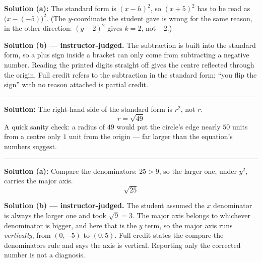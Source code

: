 \documentclass[12pt]{article}
\begin{document}




\textbf{Solution (a):} The standard form is $(x - h)^2$, so $(x + 5)^2$ has to be read as
$\bigl(x - (-5)\bigr)^2$. 
(The $y$-coordinate the student gave is wrong for the same reason, in the other direction:
$(y-2)^2$ gives $k = 2$, not $-2$.)

\vspace{0.15cm}
\textbf{Solution (b) --- instructor-judged.} The subtraction is built into the standard form,
so a plus sign inside a bracket can only come from subtracting a negative number. Reading the
printed digits straight off gives the centre reflected through the origin. Full credit refers
to the subtraction in the standard form; ``you flip the sign'' with no reason attached is
partial credit.

\vspace{0.2cm}\noindent\rule{\linewidth}{0.2pt}


\textbf{Solution:} The right-hand side of the standard form is $r^2$, not $r$.
\[ r = \sqrt{49} \]
A quick sanity check: a radius of $49$ would put the circle's edge nearly $50$ units from a
centre only $1$ unit from the origin --- far larger than the equation's numbers suggest.

\vspace{0.2cm}\noindent\rule{\linewidth}{0.2pt}


\textbf{Solution (a):} Compare the denominators: $25 > 9$, so the larger one, under $y^2$,
carries the major axis.
\[ \sqrt{25} \]

\vspace{0.15cm}
\textbf{Solution (b) --- instructor-judged.} The student assumed the $x$ denominator is
always the larger one and took $\sqrt{9} = 3$. The major axis belongs to whichever
denominator is bigger, and here that is the $y$ term, so the major axis runs
\emph{vertically}, from $(0,-5)$ to $(0,5)$. Full credit states the compare-the-denominators
rule and says the axis is vertical. Reporting only the corrected number is not a diagnosis.
\end{document}
